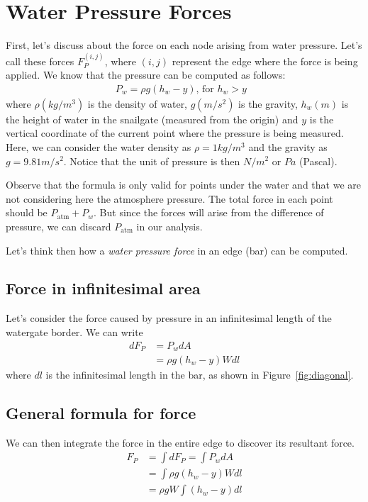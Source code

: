 \documentclass[12pt]{article}
\begin{document}
\section{Water Pressure Forces}

First, let's discuss about the force on each node arising from water pressure. Let's call these forces $F_P^{(i,j)}$, where $(i,j)$ represent the edge where the force is being applied. We know that the pressure can be computed as follows:
\begin{align*}
  P_w = \rho g (h_w - y) \text{, for $h_w > y$ }  
\end{align*}
where $\rho (kg/m^3)$ is the density of water, $g (m/s^2)$ is the gravity, $h_w (m)$ is the height of water in the snailgate (measured from the origin) and $y$ is the vertical coordinate of the current point where the pressure is being measured. Here, we can consider the water density as $\rho = 1 kg/m^3$ and the gravity as $g = 9.81 m/s^2$. Notice that the unit of pressure is then $N/m^2$ or $Pa$ (Pascal).

Observe that the formula is only valid for points under the water and that we are not considering here the atmosphere pressure. The total force in each point should be $P_{\text{atm}} + P_w$. But since the forces will arise from the difference of pressure, we can discard $P_{\text{atm}}$ in our analysis.

Let's think then how a \emph{water pressure force} in an edge (bar) can be computed.

\subsection{Force in infinitesimal area}
Let's consider the force caused by pressure in an infinitesimal length of the watergate border. We can write
\begin{align*}
  dF_P &= P_w dA\\
  &=  \rho g (h_w - y) W dl
\end{align*}
where $dl$ is the infinitesimal length in the bar, as shown in Figure~\ref{fig:diagonal}.

\subsection{General formula for force}
We can then integrate the force in the entire edge to discover its resultant force.
\begin{align*}
  F_P &= \int dF_P = \int P_w dA\\
  &= \int \rho g (h_w - y) W dl\\
  &= \rho g W \int (h_w - y) dl
\end{align*}
\end{document}
